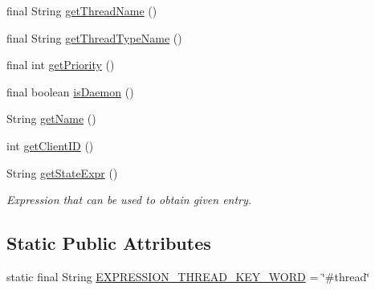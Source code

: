 \begin{DoxyCompactItemize}
\item 
final String \hyperlink{classgov_1_1nasa_1_1jpf_1_1inspector_1_1common_1_1pse_1_1_p_s_e_thread_a2c93864159960acb182f804f5705c23c}{get\+Thread\+Name} ()
\item 
final String \hyperlink{classgov_1_1nasa_1_1jpf_1_1inspector_1_1common_1_1pse_1_1_p_s_e_thread_a6427e811af26702eb971fe73ded1d651}{get\+Thread\+Type\+Name} ()
\item 
final int \hyperlink{classgov_1_1nasa_1_1jpf_1_1inspector_1_1common_1_1pse_1_1_p_s_e_thread_aafcb0b92711dcaea5d2d8089626bd972}{get\+Priority} ()
\item 
final boolean \hyperlink{classgov_1_1nasa_1_1jpf_1_1inspector_1_1common_1_1pse_1_1_p_s_e_thread_aa2509f5aa71d4d03ae4a0c17a11f08b4}{is\+Daemon} ()
\item 
String \hyperlink{classgov_1_1nasa_1_1jpf_1_1inspector_1_1common_1_1pse_1_1_program_state_entry_ac96b4ceba0c8c9c674b0cca509b63a3b}{get\+Name} ()
\item 
int \hyperlink{classgov_1_1nasa_1_1jpf_1_1inspector_1_1common_1_1pse_1_1_program_state_entry_a5f1b62c50f124c1bd01be0111706a1f5}{get\+Client\+ID} ()
\item 
String \hyperlink{classgov_1_1nasa_1_1jpf_1_1inspector_1_1common_1_1pse_1_1_program_state_entry_a9d819571ca1cc982a7d31df70548fd96}{get\+State\+Expr} ()
\begin{DoxyCompactList}\small\item\em Expression that can be used to obtain given entry. \end{DoxyCompactList}\end{DoxyCompactItemize}
\subsection*{Static Public Attributes}
\begin{DoxyCompactItemize}
\item 
static final String \hyperlink{classgov_1_1nasa_1_1jpf_1_1inspector_1_1common_1_1pse_1_1_p_s_e_thread_a3b65bb68590f1b79024da98698bb53c2}{E\+X\+P\+R\+E\+S\+S\+I\+O\+N\+\_\+\+T\+H\+R\+E\+A\+D\+\_\+\+K\+E\+Y\+\_\+\+W\+O\+RD} = \char`\"{}\#thread\char`\"{}
\end{DoxyCompactItemize}
